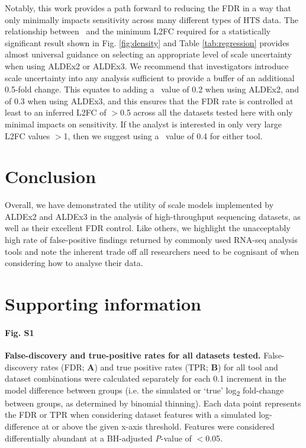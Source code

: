 \documentclass[10pt,letterpaper]{article}
\begin{document}
Notably, this work provides a path forward to reducing the FDR in a way that only minimally impacts sensitivity across many different types of HTS data. The relationship between \textgamma~and the minimum L2FC required for a statistically significant result shown in Fig. \ref{fig:density} and Table \ref{tab:regression} provides almost universal guidance on selecting an appropriate level of scale uncertainty when using ALDEx2 or ALDEx3. We recommend that investigators introduce scale uncertainty into any analysis sufficient to provide a buffer of an additional 0.5-fold change. This equates to adding a \textgamma~value of 0.2 when using ALDEx2, and of 0.3 when using ALDEx3, and this ensures that the FDR rate is controlled at least to an inferred L2FC of $>$0.5 across all the datasets tested here with only minimal impacts on sensitivity. If the analyst is interested in only very large L2FC values $>$1, then we suggest using a \textgamma~value of 0.4 for either tool.

\section*{Conclusion}
Overall, we have demonstrated the utility of scale models implemented by ALDEx2 and ALDEx3 in the analysis of high-throughput sequencing datasets, as well as their excellent FDR control. Like others, we highlight the unacceptably high rate of false-positive findings returned by commonly used RNA-seq analysis tools and note the inherent trade off all researchers need to be cognisant of when considering how to analyse their data.



\section*{Supporting information}

\paragraph*{Fig. S1}
\label{fig:supFigFDR_TPR_all}
\textbf{False-discovery and true-positive rates for all datasets tested.} False-discovery rates (FDR; \textbf{A}) and true positive rates (TPR; \textbf{B}) for all tool and dataset combinations were calculated separately for each 0.1 increment in the model difference between groups (i.e. the simulated or `true' log\textsubscript{2} fold-change between groups, as determined by binomial thinning). Each data point represents the FDR or TPR when considering dataset features with a simulated log-difference at or above the given x-axis threshold. Features were considered differentially abundant at a BH-adjusted \textit{P}-value of $<$0.05.
\end{document}
